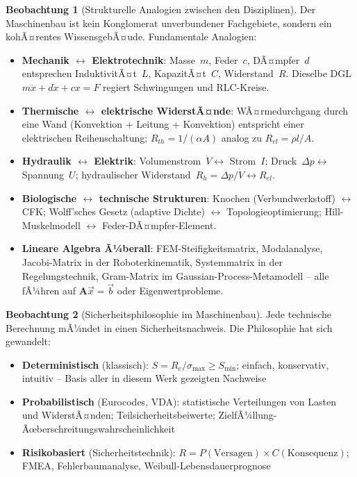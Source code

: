 ﻿\documentclass[a4paper,12pt]{report}
\theoremstyle{definition}
\newtheorem{beobachtung}{Beobachtung}
\begin{document}
\begin{beobachtung}[Strukturelle Analogien zwischen den Disziplinen]
Der Maschinenbau ist kein Konglomerat unverbundener Fachgebiete,
sondern ein kohÃ¤rentes WissensgebÃ¤ude. Fundamentale Analogien:
\begin{itemize}
    \item[-] \textbf{Mechanik $\leftrightarrow$ Elektrotechnik}: Masse~$m$,
          Feder~$c$, DÃ¤mpfer~$d$ entsprechen InduktivitÃ¤t~$L$, KapazitÃ¤t~$C$,
          Widerstand~$R$. Dieselbe DGL $m\ddot{x}+d\dot{x}+cx = F$
          regiert Schwingungen und RLC-Kreise.
    \item[-] \textbf{Thermische $\leftrightarrow$ elektrische WiderstÃ¤nde}:
          WÃ¤rmedurchgang durch eine Wand (Konvektion + Leitung + Konvektion)
          entspricht einer elektrischen Reihenschaltung; $R_{th} = 1/(\alpha A)$
          analog zu $R_{el} = \rho l/A$.
    \item[-] \textbf{Hydraulik $\leftrightarrow$ Elektrik}: Volumenstrom~$\dot{V}
          \leftrightarrow$ Strom~$I$; Druck~$\Delta p \leftrightarrow$ Spannung~$U$;
          hydraulischer Widerstand~$R_h = \Delta p/\dot{V} \leftrightarrow R_{el}$.
    \item[-] \textbf{Biologische $\leftrightarrow$ technische Strukturen}:
          Knochen (Verbundwerkstoff) $\leftrightarrow$ CFK;
          Wolff'sches Gesetz (adaptive Dichte) $\leftrightarrow$ Topologieoptimierung;
          Hill-Muskelmodell $\leftrightarrow$ Feder-DÃ¤mpfer-Element.
    \item[-] \textbf{Lineare Algebra Ã¼berall}: FEM-Steifigkeitsmatrix, Modalanalyse,
          Jacobi-Matrix in der Roboterkinematik, Systemmatrix in der Regelungstechnik,
          Gram-Matrix im Gaussian-Process-Metamodell -- alle fÃ¼hren auf
          $\mathbf{A}\vec{x} = \vec{b}$ oder Eigenwertprobleme.
\end{itemize}
\end{beobachtung}

\begin{beobachtung}[Sicherheitsphilosophie im Maschinenbau]
Jede technische Berechnung mÃ¼ndet in einen Sicherheitsnachweis.
Die Philosophie hat sich gewandelt:
\begin{itemize}
    \item[-] \textbf{Deterministisch} (klassisch): $S = R_e/\sigma_{\max} \ge S_{\min}$;
          einfach, konservativ, intuitiv -- Basis aller in diesem Werk gezeigten Nachweise
    \item[-] \textbf{Probabilistisch} (Eurocodes, VDA): statistische Verteilungen von
          Lasten und WiderstÃ¤nden; Teilsicherheitsbeiwerte; ZielfÃ¼llung-Ãœberschreitungswahrscheinlichkeit
    \item[-] \textbf{Risikobasiert} (Sicherheitstechnik): $R = P(\text{Versagen}) \times C(\text{Konsequenz})$;
          FMEA, Fehlerbaumanalyse, Weibull-Lebensdauerprognose
\end{itemize}
\end{beobachtung}
\end{document}
